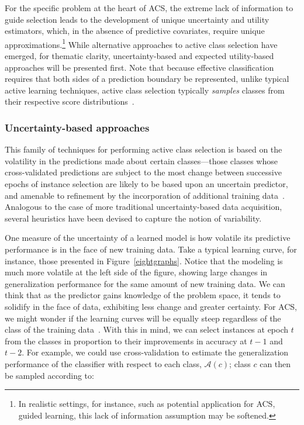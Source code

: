 For the specific problem at the heart of ACS, the extreme lack of information to guide selection leads to the development of unique uncertainty and utility estimators, which, in the absence of predictive covariates, require unique approximations.\footnote{In realistic settings, for instance, such as potential application for ACS, guided learning, this lack of information assumption may be softened.} While alternative approaches to active class selection have emerged, for thematic clarity, uncertainty-based and expected utility-based approaches will be presented first. Note that because effective classification requires that both sides of a prediction boundary be represented, unlike typical active learning techniques, active class selection typically \textit{samples} classes from their respective score distributions~\cite{Saar-tsechansky01activelearning,ml:saar-tsechansky04}.

\subsubsection{Uncertainty-based approaches}
This family of techniques for performing active class selection is based on the volatility in the predictions made about certain classes---those classes whose cross-validated predictions are subject to the most change between successive epochs of instance selection are likely to be based upon an uncertain predictor, and amenable to refinement by the incorporation of additional training data~\cite{lomasky:ecml2007, lomasky:nose2006}. Analogous to the case of more traditional uncertainty-based data acquisition, several heuristics have been devised to capture the notion of variability.

One measure of the uncertainty of a learned model is how volatile its predictive performance is in the face of new training data.  Take a  typical learning curve, for instance, those presented in  Figure~\ref{eightgraphs}. Notice that the modeling is much more volatile at the left side of the figure, showing large changes in generalization performance for the same amount of new training data.
We can think that as the predictor gains knowledge of the problem space, it tends to solidify in the face of data, exhibiting less change and greater certainty. For ACS, we might wonder if the learning curves will be equally steep regardless of the class of the training data~\cite{lomasky:ecml2007, lomaskyThesis, lomasky:nose2006}.
With this in mind, we can select instances at epoch $t$ from the classes in proportion to their improvements in accuracy at $t-1$ and $t-2$. For example, we could use cross-validation to estimate the generalization performance of the classifier with respect to each class, $\mathcal{A}(c)$; class $c$ can then be sampled according to:

